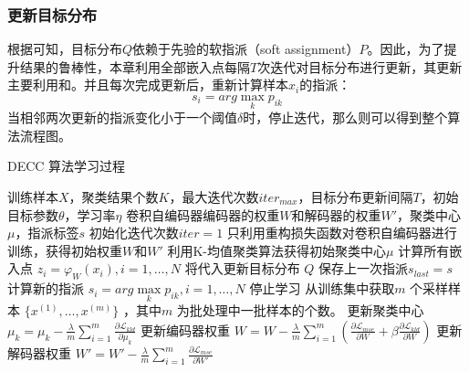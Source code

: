 \subsubsection{更新目标分布}
根据可知，目标分布$Q$依赖于先验的软指派（soft assignment）$P$。因此，为了提升结果的鲁棒性，本章利用全部嵌入点每隔$T$次迭代对目标分布进行更新，其更新主要利用和。并且每次完成更新后，重新计算样本$x_i$的指派：
\begin{equation}
	s_i=arg \max \limits_k p_{ik}
	\label{equ:assign}
\end{equation}
当相邻两次更新的指派变化小于一个阈值$\delta$时，停止迭代，那么则可以得到整个算法流程图。
\begin{algorithm}[H]
	\caption{DECC 算法学习过程}
	\begin{algorithmic}[1] %
		\Require 训练样本$X$，聚类结果个数$K$，最大迭代次数$iter_{max}$，目标分布更新间隔$T$，初始目标参数$\theta$，学习率$\eta$
		\Ensure 卷积自编码器编码器的权重$W$和解码器的权重$W'$，聚类中心$\mu$，指派标签$s$
		\State 初始化迭代次数$iter=1$
		\State 只利用重构损失函数对卷积自编码器进行训练，获得初始权重$W$和$W'$
		\State 利用K-均值聚类算法获得初始聚类中心$\mu$
				\State 计算所有嵌入点 $z_i=\varphi_W(x_i),i=1,\dots,N$
				\State 将代入更新目标分布 $Q$
				\State 保存上一次指派$s_{last}=s$
				\State 计算新的指派 $s_i=arg \max \limits_k p_{ik}, i= 1,\dots,N$
					\State 停止学习
				\EndIf
			\EndIf
			\State 从训练集中获取$m$ 个采样样本 $\{x^{(1)},\dots,x^{(m)}\}$ ，其中$m$ 为批处理中一批样本的个数。
			\State 更新聚类中心$\mu_k=\mu_k-\frac{\lambda}{m}\sum_{i=1}^m{\frac{\partial \mathscr{L}_{kld}}{\partial \mu_k}}$
			\State 更新编码器权重 $W=W-\frac{\lambda}{m}\sum_{i=1}^m(\frac{\partial \mathscr{L}_{mse}}{\partial W} + \beta \frac{\partial \mathscr{L}_{kld}}{\partial W})$
			\State 更新解码器权重 $W'=W'-\frac{\lambda}{m}\sum_{i=1}^m{\frac{\partial \mathscr{L}_{mse}}{\partial W'}}$
		\EndWhile
	\end{algorithmic}
\end{algorithm}
